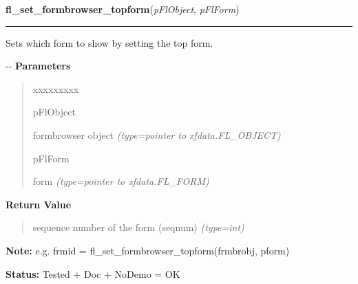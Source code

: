 \hspace{.8\funcindent}\begin{boxedminipage}{\funcwidth}

    \raggedright \textbf{fl\_set\_formbrowser\_topform}(\textit{pFlObject}, \textit{pFlForm})

    \vspace{-1.5ex}

    \rule{\textwidth}{0.5\fboxrule}
\setlength{\parskip}{2ex}

Sets which form to show by setting the top form.

-{}-
\setlength{\parskip}{1ex}
      \textbf{Parameters}
      \vspace{-1ex}

      \begin{quote}
        \begin{Ventry}{xxxxxxxxx}

          \item[pFlObject]


formbrowser object
            {\it (type=pointer to xfdata.FL\_OBJECT)}

          \item[pFlForm]


form
            {\it (type=pointer to xfdata.FL\_FORM)}

        \end{Ventry}

      \end{quote}

      \textbf{Return Value}
    \vspace{-1ex}

      \begin{quote}

sequence number of the form (seqnum)
      {\it (type=int)}

      \end{quote}

\textbf{Note:} 
e.g. frmid = fl\_set\_formbrowser\_topform(frmbrobj, pform)


\textbf{Status:} 
Tested + Doc + NoDemo = OK


    \end{boxedminipage}

    \label{xformslib:flformbrowser:fl_set_formbrowser_topform_bynumber}

    \vspace{0.5ex}

